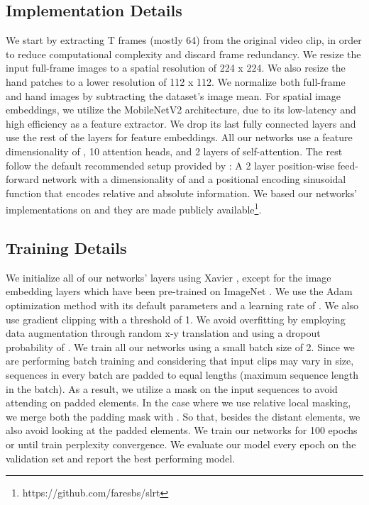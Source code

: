 \documentclass[a4paper,conference]{IEEEtran}
\begin{document}
\subsection{Implementation Details}
We start by extracting T frames (mostly 64) from the original video clip, in order to reduce computational complexity and discard frame redundancy. We resize the input full-frame images to a spatial resolution of 224 x 224. We also resize the hand patches to a lower resolution of 112 x 112. We normalize both full-frame and hand images by subtracting the dataset's image mean. For spatial image embeddings, we utilize the MobileNetV2 \cite{sandler2018mobilenetv2} architecture, due to its low-latency and high efficiency as a feature extractor. We drop its last fully connected layers and use the rest of the layers for feature embeddings. All our networks use a feature dimensionality of , 10 attention heads, and 2 layers of self-attention. The rest follow the default recommended setup provided by \cite{vaswani2017attention}: A 2 layer position-wise feed-forward network with a dimensionality of  and a positional encoding sinusoidal function that encodes relative and absolute information. We based our networks' implementations on \cite{opennmt} and they are made publicly available\footnote{https://github.com/faresbs/slrt}. 

	
\subsection{Training Details}

We initialize all of our networks' layers using Xavier \cite{glorot2010understanding}, except for the image embedding layers which have been pre-trained on ImageNet \cite{deng2009imagenet}. We use the Adam \cite{kingma2014adam} optimization method with its default parameters and a learning rate of .  We also use gradient clipping with a threshold of 1. We avoid overfitting by employing data augmentation through random x-y translation and using a dropout probability of . We train all our networks using a small batch size of 2. Since we are performing batch training and considering that input clips may vary in size, sequences in every batch are padded to equal lengths (maximum sequence length in the batch). As a result, we utilize a mask on the input sequences to avoid attending on padded elements. In the case where we use relative local masking, we merge both the padding mask with . So that, besides the distant elements, we also avoid looking at the padded elements. 
We train our networks for 100 epochs or until train perplexity convergence. We evaluate our model every epoch on the validation set and report the best performing model. 
\end{document}
